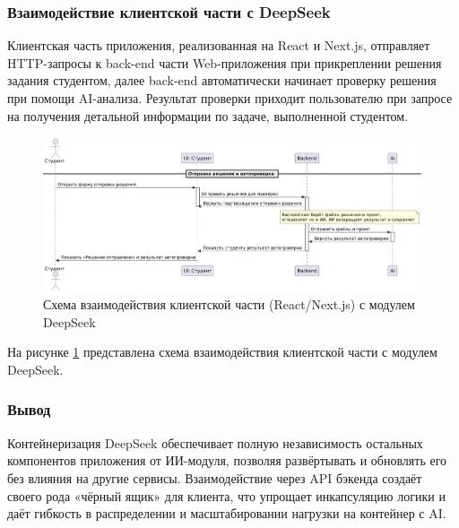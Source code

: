 \subsubsection{Взаимодействие клиентской части с DeepSeek}

Клиентская часть приложения, реализованная на React и Next.js, отправляет HTTP-запросы к back-end части Web-приложения при прикреплении решения задания студентом, далее back-end автоматически начинает проверку решения при помощи AI-анализа. Результат проверки приходит пользователю при запросе на получения детальной информации по задаче, выполненной студентом.

\begin{figure}[H]
    \centering
    \includegraphics[width=0.8\linewidth]{static/diagrams/TaskSendStudentDiagram.png}
    \caption{Схема взаимодействия клиентской части (React/Next.js) с модулем DeepSeek}
    \label{fig:client-deepseek}
\end{figure}

На рисунке \ref{fig:client-deepseek} представлена схема взаимодействия клиентской части с модулем DeepSeek.

\subsubsection{Вывод}

Контейнеризация DeepSeek обеспечивает полную независимость остальных компонентов приложения от ИИ-модуля, позволяя развёртывать и обновлять его без влияния на другие сервисы. Взаимодействие через API бэкенда создаёт своего рода «чёрный ящик» для клиента, что упрощает инкапсуляцию логики и даёт гибкость в распределении и масштабировании нагрузки на контейнер с AI.


